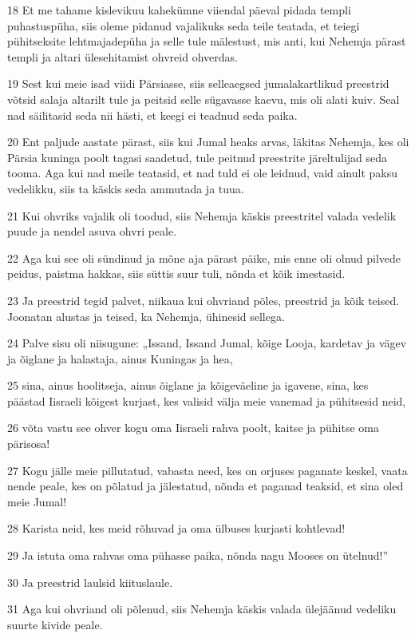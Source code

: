 \par 18 Et me tahame kislevikuu kahekümne viiendal päeval pidada templi puhastuspüha, siis oleme pidanud vajalikuks seda teile teatada, et teiegi pühitseksite lehtmajadepüha ja selle tule mälestust, mis anti, kui Nehemja pärast templi ja altari ülesehitamist ohvreid ohverdas.
\par 19 Sest kui meie isad viidi Pärsiasse, siis selleaegsed jumalakartlikud preestrid võtsid salaja altarilt tule ja peitsid selle sügavasse kaevu, mis oli alati kuiv. Seal nad säilitasid seda nii hästi, et keegi ei teadnud seda paika.
\par 20 Ent paljude aastate pärast, siis kui Jumal heaks arvas, läkitas Nehemja, kes oli Pärsia kuninga poolt tagasi saadetud, tule peitnud preestrite järeltulijad seda tooma. Aga kui nad meile teatasid, et nad tuld ei ole leidnud, vaid ainult paksu vedelikku, siis ta käskis seda ammutada ja tuua.
\par 21 Kui ohvriks vajalik oli toodud, siis Nehemja käskis preestritel valada vedelik puude ja nendel asuva ohvri peale.
\par 22 Aga kui see oli sündinud ja mõne aja pärast päike, mis enne oli olnud pilvede peidus, paistma hakkas, siis süttis suur tuli, nõnda et kõik imestasid.
\par 23 Ja preestrid tegid palvet, niikaua kui ohvriand põles, preestrid ja kõik teised. Joonatan alustas ja teised, ka Nehemja, ühinesid sellega.
\par 24 Palve sisu oli niisugune: „Issand, Issand Jumal, kõige Looja, kardetav ja vägev ja õiglane ja halastaja, ainus Kuningas ja hea,
\par 25 sina, ainus hoolitseja, ainus õiglane ja kõigeväeline ja igavene, sina, kes päästad Iisraeli kõigest kurjast, kes valisid välja meie vanemad ja pühitsesid neid,
\par 26 võta vastu see ohver kogu oma Iisraeli rahva poolt, kaitse ja pühitse oma pärisosa!
\par 27 Kogu jälle meie pillutatud, vabasta need, kes on orjuses paganate keskel, vaata nende peale, kes on põlatud ja jälestatud, nõnda et paganad teaksid, et sina oled meie Jumal!
\par 28 Karista neid, kes meid rõhuvad ja oma ülbuses kurjasti kohtlevad!
\par 29 Ja istuta oma rahvas oma pühasse paika, nõnda nagu Mooses on ütelnud!”
\par 30 Ja preestrid laulsid kiituslaule.
\par 31 Aga kui ohvriand oli põlenud, siis Nehemja käskis valada ülejäänud vedeliku suurte kivide peale.
